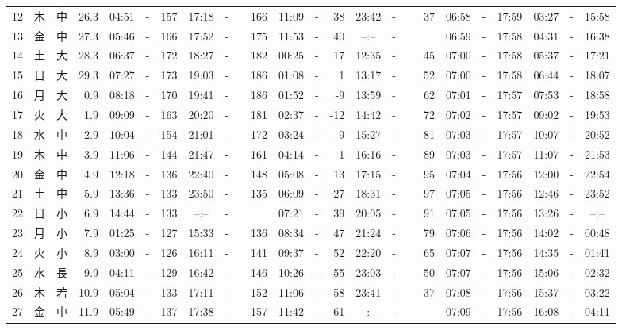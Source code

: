 \documentclass[12pt,a4j]{jsarticle}
\begin{document}
\begin{table}[htbp]
\begin{center}
{\begin{tabular}{|rc|cr|ccrccr|ccrccr|ccc|ccc|}
12 & 木 & 中 & 26.3 &  04:51 &-& 157 &  17:18 &-& 166 &  11:09 &-&  38 &  23:42 &-&  37 & 06:58 & -& 17:59 & 03:27 & -& 15:58 \\
13 & 金 & 中 & 27.3 &  05:46 &-& 166 &  17:52 &-& 175 &  11:53 &-&  40 &  --:-- &-&~~~~~ & 06:59 & -& 17:58 & 04:31 & -& 16:38 \\
14 & 土 & 大 & 28.3 &  06:37 &-& 172 &  18:27 &-& 182 &  00:25 &-&  17 &  12:35 &-&  45 & 07:00 & -& 17:58 & 05:37 & -& 17:21 \\
15 & 日 & 大 & 29.3 &  07:27 &-& 173 &  19:03 &-& 186 &  01:08 &-&   1 &  13:17 &-&  52 & 07:00 & -& 17:58 & 06:44 & -& 18:07 \\
16 & 月 & 大 &  0.9 &  08:18 &-& 170 &  19:41 &-& 186 &  01:52 &-&  -9 &  13:59 &-&  62 & 07:01 & -& 17:57 & 07:53 & -& 18:58 \\
17 & 火 & 大 &  1.9 &  09:09 &-& 163 &  20:20 &-& 181 &  02:37 &-& -12 &  14:42 &-&  72 & 07:02 & -& 17:57 & 09:02 & -& 19:53 \\
18 & 水 & 中 &  2.9 &  10:04 &-& 154 &  21:01 &-& 172 &  03:24 &-&  -9 &  15:27 &-&  81 & 07:03 & -& 17:57 & 10:07 & -& 20:52 \\
19 & 木 & 中 &  3.9 &  11:06 &-& 144 &  21:47 &-& 161 &  04:14 &-&   1 &  16:16 &-&  89 & 07:03 & -& 17:57 & 11:07 & -& 21:53 \\
20 & 金 & 中 &  4.9 &  12:18 &-& 136 &  22:40 &-& 148 &  05:08 &-&  13 &  17:15 &-&  95 & 07:04 & -& 17:56 & 12:00 & -& 22:54 \\
21 & 土 & 中 &  5.9 &  13:36 &-& 133 &  23:50 &-& 135 &  06:09 &-&  27 &  18:31 &-&  97 & 07:05 & -& 17:56 & 12:46 & -& 23:52 \\
22 & 日 & 小 &  6.9 &  14:44 &-& 133 &  --:-- &-&~~~~~ &  07:21 &-&  39 &  20:05 &-&  91 & 07:05 & -& 17:56 & 13:26 & -& --:-- \\
23 & 月 & 小 &  7.9 &  01:25 &-& 127 &  15:33 &-& 136 &  08:34 &-&  47 &  21:24 &-&  79 & 07:06 & -& 17:56 & 14:02 & -& 00:48 \\
24 & 火 & 小 &  8.9 &  03:00 &-& 126 &  16:11 &-& 141 &  09:37 &-&  52 &  22:20 &-&  65 & 07:07 & -& 17:56 & 14:35 & -& 01:41 \\
25 & 水 & 長 &  9.9 &  04:11 &-& 129 &  16:42 &-& 146 &  10:26 &-&  55 &  23:03 &-&  50 & 07:07 & -& 17:56 & 15:06 & -& 02:32 \\
26 & 木 & 若 & 10.9 &  05:04 &-& 133 &  17:11 &-& 152 &  11:06 &-&  58 &  23:41 &-&  37 & 07:08 & -& 17:56 & 15:37 & -& 03:22 \\
27 & 金 & 中 & 11.9 &  05:49 &-& 137 &  17:38 &-& 157 &  11:42 &-&  61 &  --:-- &-&~~~~~ & 07:09 & -& 17:56 & 16:08 & -& 04:11 \\

\end{tabular}}
\end{center}
\end{table}
\end{document}
